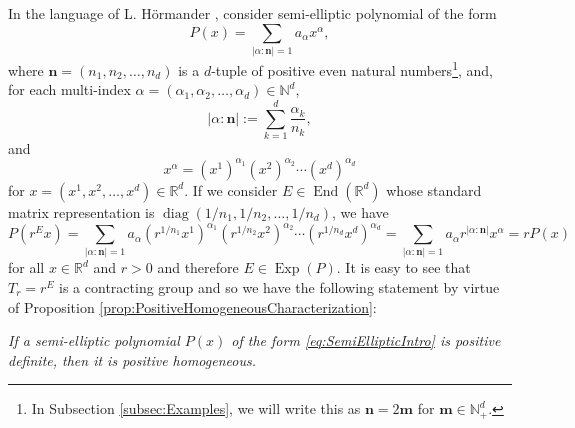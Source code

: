 \documentclass[11pt]{article}
\newenvironment{example}
  {\pushQED{\qed}\renewcommand{\qedsymbol}{$\triangle$}\examplex}
  {\popQED\endexamplex}
\theoremstyle{remark}
\newcommand\End{\operatorname{End}} %
\newcommand\Exp{\operatorname{Exp}}
\newcommand\diag{\operatorname{diag}}
\begin{document}
\begin{example}\label{exp:Polynomial}\normalfont
In the language of L. H\"{o}rmander \cite{hormander_analysis_1983}, consider semi-elliptic polynomial of the form
\begin{equation}\label{eq:SemiEllipticIntro}
    P(x)=\sum_{|\alpha:\mathbf{n}|=1}a_\alpha x^\alpha,
\end{equation}
where $\mathbf{n}=(n_1,n_2,\dots,n_d)$ is a $d$-tuple of positive even natural numbers\footnote{In Subsection \ref{subsec:Examples}, we will write this as $\mathbf{n}=2\mathbf{m}$ for $\mathbf{m}\in\mathbb{N}_+^d$.}, and, for each multi-index $\alpha =(\alpha_1,\alpha_2,\dots,\alpha_d)\in\mathbb{N}^d$,
\begin{equation*}
    |\alpha:\mathbf{n}|:=\sum_{k=1}^d\frac{\alpha_k}{n_k},
\end{equation*}
and
\begin{equation*}
    x^\alpha=\left(x^1\right)^{\alpha_1}\left(x^2\right)^{\alpha_2}\cdots\left(x^d\right)^{\alpha_d}
\end{equation*}
for $x=\left(x^1,x^2,\dots,x^d\right)\in\mathbb{R}^d$. If we consider $E\in\End(\mathbb{R}^d)$ whose standard matrix representation is $\diag(1/n_1,1/n_2,\dots,1/n_d)$, we have
\begin{equation*}
    P\left(r^Ex\right)=\sum_{|\alpha:\mathbf{n}|=1}a_{\alpha}\left(r^{1/n_1}x^1\right)^{\alpha_1}\left(r^{1/n_2}x^2\right)^{\alpha_2}\cdots\left(r^{1/n_d}x^d\right)^{\alpha_d}=\sum_{|\alpha:\mathbf{n}|=1}a_\alpha r^{|\alpha:\mathbf{n}|}x^\alpha=rP(x)
\end{equation*}
for all $x\in\mathbb{R}^d$ and $r>0$ and therefore $E\in\Exp(P)$. It is easy to see that $T_r=r^E$ is a contracting group and so we have the following statement by virtue of Proposition \ref{prop:PositiveHomogeneousCharacterization}: \begin{center}\textit{If a semi-elliptic polynomial $P(x)$ of the form \eqref{eq:SemiEllipticIntro} is positive definite, then it is positive homogeneous.}
\end{center}


\end{example}
\end{document}
